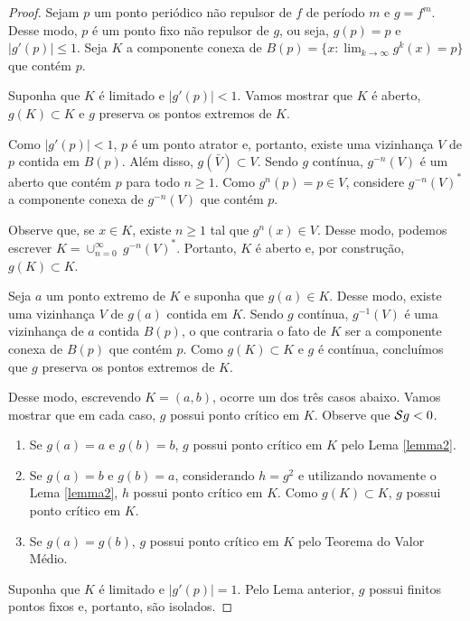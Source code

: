 \begin{proof}
Sejam $p$ um ponto periódico não repulsor de $f$ de período $m$ e $g = f^m$. Desse modo, $p$ é um ponto fixo não repulsor de $g$, ou seja, $g(p) = p$ e $|g'(p)| \leq 1$. Seja $K$ a componente conexa de $B(p) = \{ x : \lim_{k \to \infty} g^k(x) = p \}$ que contém $p$.

Suponha que $K$ é limitado e $|g'(p)| < 1$. Vamos mostrar que $K$ é aberto, $g(K) \subset K$ e $g$ preserva os pontos extremos de $K$.

Como $|g'(p)| < 1$, $p$ é um ponto atrator e, portanto, existe uma vizinhança $V$ de $p$ contida em $B(p)$. Além disso, $g(\bar{V}) \subset V$. Sendo $g$ contínua, $g^{-n}(V)$ é um aberto que contém $p$ para todo $n \geq 1$. Como $g^n(p) = p \in V$, considere $g^{-n}(V)^*$ a componente conexa de $g^{-n}(V)$ que contém $p$.

Observe que, se $x \in K$, existe $n \geq 1$ tal que $g^n(x) \in V$. Desse modo, podemos escrever $K = \cup^{\infty}_{n = 0} \ g^{-n}(V)^*$. Portanto, $K$ é aberto e, por construção, $g(K) \subset K$.

Seja $a$ um ponto extremo de $K$ e suponha que $g(a) \in K$. Desse modo, existe uma vizinhança $V$ de $g(a)$ contida em $K$. Sendo $g$ contínua, $g^{-1}(V)$ é uma vizinhança de $a$ contida $B(p)$, o que contraria o fato de $K$ ser a componente conexa de $B(p)$ que contém $p$. Como $g(K) \subset K$ e $g$ é contínua, concluímos que $g$ preserva os pontos extremos de $K$.

Desse modo, escrevendo $K = (a, b)$, ocorre um dos três casos abaixo. Vamos mostrar que em cada caso, $g$ possui ponto crítico em $K$. Observe que $\mathcal{S} g < 0$.

\begin{enumerate}[label=\alph*)]

\item Se $g(a) = a$ e $g(b) = b$, $g$ possui ponto crítico em $K$ pelo Lema \ref{lemma2}.
\item Se $g(a) = b$ e $g(b) = a$,  considerando $h = g^2$ e utilizando novamente o Lema \ref{lemma2}, $h$ possui ponto crítico em $K$. Como $g(K) \subset K$, $g$ possui ponto crítico em $K$.
\item Se $g(a) = g(b)$, $g$ possui ponto crítico em $K$ pelo Teorema do Valor Médio.
\end{enumerate}

Suponha que $K$ é limitado e $|g'(p)| = 1$. Pelo Lema anterior, $g$ possui finitos pontos fixos e, portanto, são isolados.


\end{proof}
